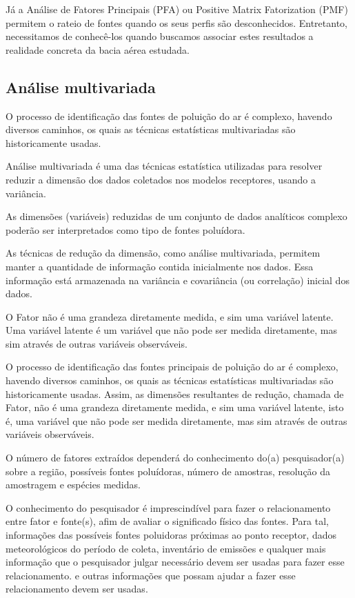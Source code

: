 Já a Análise de Fatores Principais (PFA) ou Positive Matrix Fatorization (PMF) 
permitem o rateio de fontes quando os seus perfis são desconhecidos. Entretanto,
necessitamos de conhecê-los quando buscamos associar estes resultados a realidade 
concreta da bacia aérea estudada. 


\subsection{Análise multivariada}

O processo de identificação das fontes de poluição do ar é 
complexo, havendo diversos caminhos, os quais as técnicas estatísticas
multivariadas são historicamente usadas.
 
Análise multivariada é uma das técnicas estatística utilizadas para 
resolver reduzir a dimensão dos dados coletados nos modelos receptores, 
usando a variância. 

As dimensões (variáveis) reduzidas de um conjunto de dados analíticos 
complexo poderão ser interpretados como tipo de fontes poluídora.

As técnicas de redução da dimensão, como análise multivariada, 
permitem manter a quantidade de informação contida inicialmente nos dados. 
Essa informação está armazenada na variância e covariância (ou correlação) 
inicial dos dados. 

O Fator não é uma grandeza diretamente medida, e sim uma variável latente.
Uma variável latente é um variável que não pode ser medida diretamente, 
mas sim através de outras variáveis observáveis. 

O processo de identificação das fontes principais de poluição do ar é 
complexo, havendo diversos caminhos, os quais as técnicas estatísticas
multivariadas são historicamente usadas.
Assim, as dimensões resultantes de redução, chamada de Fator, 
não é uma grandeza diretamente medida, e sim uma variável latente, 
isto é, uma variável que não pode ser medida diretamente, 
mas sim através de outras variáveis observáveis.

O número de fatores extraídos dependerá do conhecimento do(a) pesquisador(a)
sobre a região, possíveis fontes poluídoras, número de amostras, 
resolução da amostragem e espécies medidas.

O conhecimento do pesquisador é imprescindível para fazer o relacionamento 
entre fator e fonte(s), afim de avaliar o significado físico das fontes. 
Para tal, informações das possíveis fontes poluidoras próximas ao ponto 
receptor, dados meteorológicos do período de coleta, inventário de emissões 
e qualquer mais informação que o pesquisador julgar necessário devem ser 
usadas para fazer esse relacionamento.
e outras informações que possam ajudar a fazer esse relacionamento devem ser usadas.

